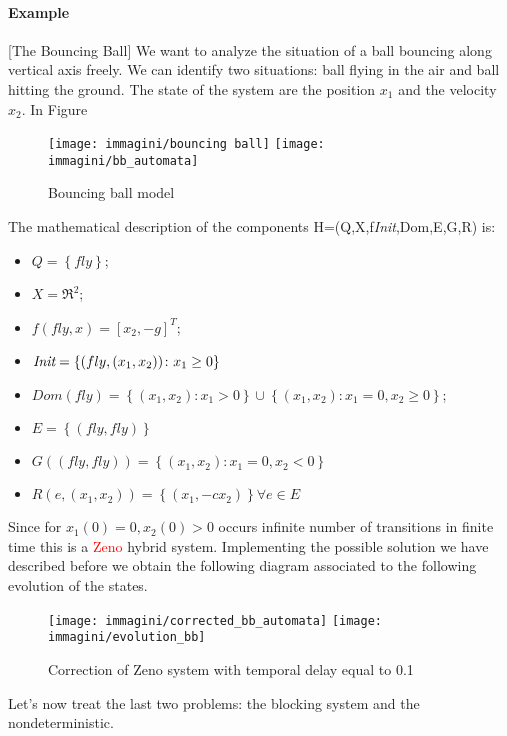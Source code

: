 \paragraph{Example}[The Bouncing Ball]
We want to analyze the situation of a ball bouncing along vertical axis freely. We can identify two situations: ball flying in the air and ball hitting the ground. The state of the system are the position $x_1$ and the velocity $x_2$. In Figure
\begin{figure}[h]
	\centering
	\texttt{[image: immagini/bouncing ball]}
	\texttt{[image: immagini/bb\_automata]}
	\caption{Bouncing ball model}
	\label{fig:bbautomata}
\end{figure}
The mathematical description of the components H=(Q,X,f\textit{Init},Dom,E,G,R) is:
\begin{itemize}
	\item $Q=\left\{fly\right\}$;
	\item $X=\Re^2$;
	\item $f(fly,x)=[x_2,-g]^T$; 
	\item $\emph{Init}=\left\{(fly,(x_1,x_2))\colon x_1\ge0\right\}$ 
	\item $Dom(fly)=\left\{(x_1,x_2)\colon x_1>0\right\} \cup \left\{(x_1,x_2)\colon x_1= 0, x_2\ge 0 \right\}$;
	\item $E=\left\{(fly,fly)\right\}$
	\item$G((fly,fly))=\left\{(x_1,x_2)\colon x_1= 0, x_2<0 \right\}$
	\item$R(e,(x_1,x_2))=\left\{(x_1,-cx_2) \right\} \forall e \in E$
\end{itemize}
Since for $x_1(0)=0, x_2(0)>0$ occurs infinite number of transitions in finite time this is a \textcolor{red}{Zeno} hybrid system.
Implementing the possible solution we have described before we obtain the following diagram associated to the following evolution of the states.
\begin{figure}[h]
	\centering
	\texttt{[image: immagini/corrected\_bb\_automata]}
	\texttt{[image: immagini/evolution\_bb]}
	\caption{Correction of Zeno system with temporal delay equal to 0.1}
	\label{fig:bbautomata_corrected}
\end{figure}
Let's now treat the last two problems: the blocking system and the nondeterministic.
